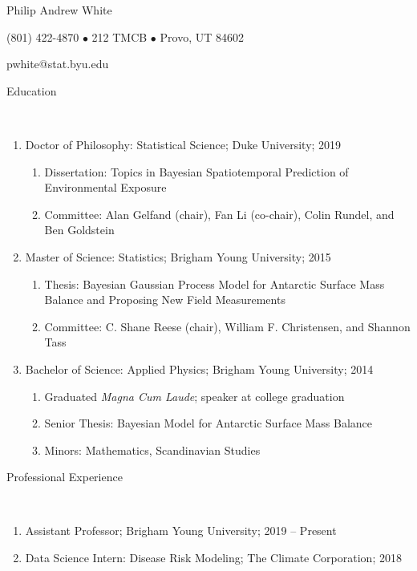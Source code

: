 \documentclass[12pt]{article}
\newcommand{\head}[1]{ %
    \bigskip %
    \begin{large}\begin{bf}{#1}\end{bf}\end{large} %

    \ \\ [-1.3cm] %

    \hrulefill}
\begin{document}

\centerline{ \LARGE Philip Andrew White }
\smallskip
\centerline{ (801) 422-4870 $\bullet$ 212 TMCB $\bullet$ Provo, UT 84602 }
\smallskip
\centerline{pwhite@stat.byu.edu }
\smallskip


\head{Education}

\begin{enumerate}[label=$\bullet$]
\item Doctor of Philosophy: Statistical Science; Duke University; 2019
\begin{enumerate}[label=$\cdot$]
\item Dissertation: Topics in Bayesian Spatiotemporal Prediction of Environmental Exposure
\item Committee: Alan Gelfand (chair), Fan Li (co-chair), Colin Rundel, and Ben Goldstein
\end{enumerate}

\item Master of Science: Statistics; Brigham Young University; 2015

\begin{enumerate}[label=$\cdot$]
\item Thesis: Bayesian Gaussian Process Model for Antarctic Surface Mass Balance and Proposing New Field Measurements
\item  Committee: C. Shane Reese (chair), William F. Christensen, and Shannon Tass
\end{enumerate}

\item Bachelor of Science: Applied Physics; Brigham Young University; 2014 

\begin{enumerate}[label=$\cdot$]
\item Graduated \emph{Magna Cum Laude}; speaker at college graduation
\item Senior Thesis: Bayesian Model for Antarctic Surface Mass Balance
\item Minors: Mathematics, Scandinavian Studies
\end{enumerate}
\end{enumerate}


\head{Professional Experience}

\begin{enumerate}[label=$\bullet$]

\item Assistant Professor; Brigham Young University; 2019 -- Present

\item Data Science Intern: Disease Risk Modeling; The Climate Corporation; 2018

\end{enumerate}
\end{document}
